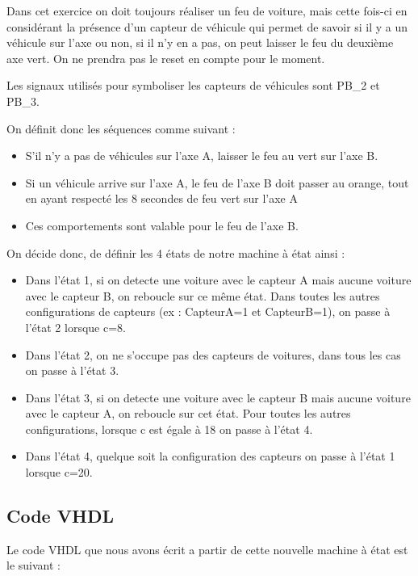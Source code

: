 \documentclass[11pt]{report}
\begin{document}
Dans cet exercice on doit toujours réaliser un feu de voiture, mais cette fois-ci en considérant la présence d'un capteur de véhicule qui permet de savoir si il y a un véhicule sur l'axe ou non, si il n'y en a pas, on peut laisser le feu du deuxième axe vert. On ne prendra pas le reset en compte pour le moment.

Les signaux utilisés pour symboliser les capteurs de véhicules sont PB\_2 et PB\_3.

On définit donc les séquences comme suivant :
\begin{itemize}
	\item S'il n'y a pas de véhicules sur l'axe A, laisser le feu au vert sur l'axe B.
	\item Si un véhicule arrive sur l'axe A, le feu de l'axe B doit passer au orange, tout en ayant respecté les 8 secondes de feu vert sur l'axe A
	\item Ces comportements sont valable pour le feu de l'axe B. 

\end{itemize}

On décide donc, de définir les 4 états de notre machine à état ainsi :
\begin{itemize}
\item Dans l'état 1, si on detecte une voiture avec le capteur A mais aucune voiture avec le capteur B, on reboucle sur ce même état. Dans toutes les autres configurations de capteurs (ex : CapteurA=1 et CapteurB=1), on passe à l'état 2 lorsque c=8.
\item Dans l'état 2, on ne s'occupe pas des capteurs de voitures, dans tous les cas on passe à l'état 3.
\item Dans l'état 3, si on detecte une voiture avec le capteur B mais aucune voiture avec le capteur A, on reboucle sur cet état. Pour toutes les autres configurations, lorsque c est égale à 18 on passe à l'état 4.
\item Dans l'état 4, quelque soit la configuration des capteurs on passe à l'état 1 lorsque c=20.


\end{itemize}






\subsection{Code VHDL}

Le code VHDL que nous avons écrit a partir de cette nouvelle machine à état est le suivant : 
\end{document}

